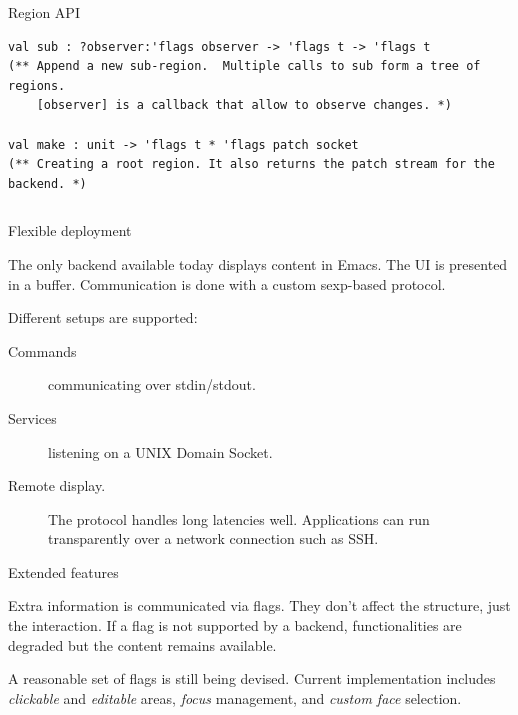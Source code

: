\documentclass[final]{beamer}
\newlength{\onecolwid}
\newlength{\twocolwid}
\begin{document}
\begin{frame}[containsverbatim,t]
\begin{columns}[t]
\begin{column}{\twocolwid}
\begin{alertblock}{Region API}
\begin{lstlisting}
val sub : ?observer:'flags observer -> 'flags t -> 'flags t
(** Append a new sub-region.  Multiple calls to sub form a tree of regions.
    [observer] is a callback that allow to observe changes. *)

val make : unit -> 'flags t * 'flags patch socket
(** Creating a root region. It also returns the patch stream for the backend. *)
\end{lstlisting}


\end{alertblock}


\begin{columns}[t,totalwidth=\twocolwid] %

\begin{column}{\onecolwid}\vspace{-.6in} %

\begin{block}{Flexible deployment}

The only backend available today displays content in Emacs.  The UI is
presented in a buffer.  Communication is done with a custom sexp-based
protocol.

Different setups are supported:

\begin{description}
  \item[Commands] communicating over stdin/stdout.
  \item[Services] listening on a UNIX Domain Socket.
  \item[Remote display.] The protocol handles long latencies well.
    Applications can run transparently over a network connection such as SSH.
\end{description}
\end{block}

\begin{block}{Extended features}

Extra information is communicated via flags. They don't affect the
structure, just the interaction.  If a flag is not supported by a backend,
functionalities are degraded but the content remains available.

A reasonable set of flags is still being devised.   Current implementation
includes {\em clickable} and {\em editable} areas, {\em focus} management, and
{\em custom face} selection.


\end{block}
\end{column}
\end{columns}
\end{column}
\end{columns}
\end{frame}
\end{document}
